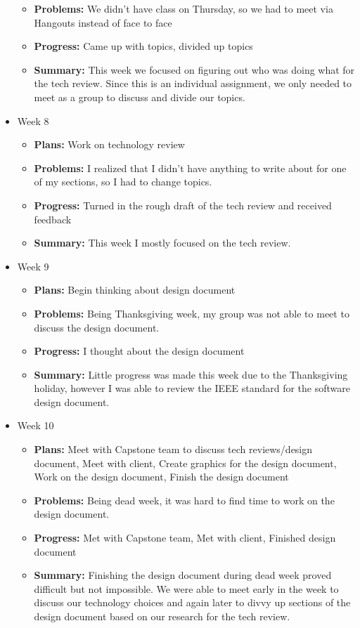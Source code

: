 \documentclass[onecolumn, draftclsnofoot,10pt, compsoc]{IEEEtran}
\begin{document}
\begin{itemize}
\begin{itemize}
    \item \textbf{Problems:} We didn't have class on Thursday, so we had to meet via Hangouts instead of face to face
    \item \textbf{Progress:} Came up with topics, divided up topics
    \item \textbf{Summary:} This week we focused on figuring out who was doing what for the tech review. Since this is an individual assignment, we only needed to meet as a group to discuss and divide our topics.
	\end{itemize}
\item Week 8
	\begin{itemize}
	\item \textbf{Plans:} Work on technology review
    \item \textbf{Problems:} I realized that I didn't have anything to write about for one of my sections, so I had to change topics.
    \item \textbf{Progress:} Turned in the rough draft of the tech review and received feedback
    \item \textbf{Summary:} This week I mostly focused on the tech review.
	\end{itemize}
\item Week 9
	\begin{itemize}
	\item \textbf{Plans:} Begin thinking about design document
    \item \textbf{Problems:} Being Thanksgiving week, my group was not able to meet to discuss the design document.
    \item \textbf{Progress:} I thought about the design document
    \item \textbf{Summary:} Little progress was made this week due to the Thanksgiving holiday, however I was able to review the IEEE standard for the software design document.
	\end{itemize}
\item Week 10
	\begin{itemize}
	\item \textbf{Plans:} Meet with Capstone team to discuss tech reviews/design document, Meet with client, Create graphics for the design document, Work on the design document, Finish the design document
    \item \textbf{Problems:} Being dead week, it was hard to find time to work on the design document.
    \item \textbf{Progress:} Met with Capstone team, Met with client, Finished design document
    \item \textbf{Summary:} Finishing the design document during dead week proved difficult but not impossible. We were able to meet early in the week to discuss our technology choices and again later to divvy up sections of the design document based on our research for the tech review.
	\end{itemize}
\end{itemize}
\end{document}
